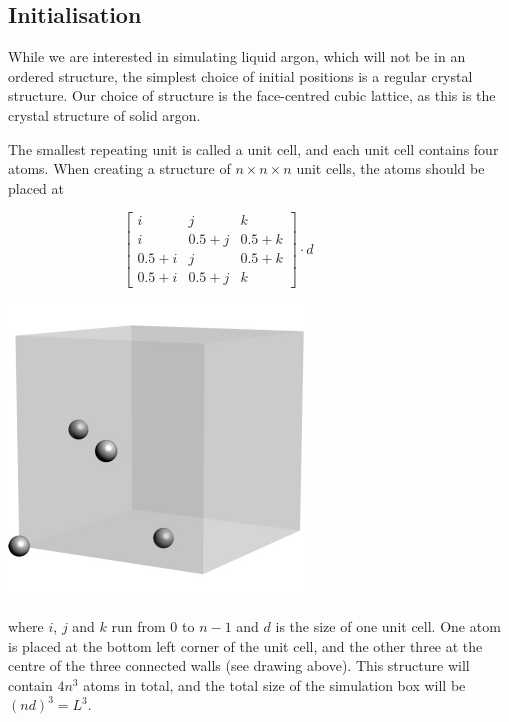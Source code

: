 \documentclass[11pt,british,a4paper]{report}
\begin{document}
\subsection{Initialisation}
While we are interested in simulating liquid argon, which will not be in an ordered structure, the simplest choice of initial positions is a regular crystal structure. Our choice of structure is the face-centred cubic lattice, as this is the crystal structure of solid argon.

The smallest repeating unit is called a unit cell, and each unit cell contains four atoms. When creating a structure of \(n\times n\times n\) unit cells, the atoms should be placed at

\hspace{0.1\textwidth}
\begin{minipage}{0.4\textwidth}
    \centering
    \hfill
    \[
        \begin{bmatrix}
            i & j & k \\
            i & 0.5+j & 0.5+k \\
            0.5+i & j & 0.5+k \\
            0.5+i & 0.5+j & k
        \end{bmatrix}\cdot d\qquad \qquad\qquad
    \]
\end{minipage}
\begin{minipage}{0.4\textwidth}
    \centering
    \includegraphics{fig.pdf}
\end{minipage}

where \(i\), \(j\) and \(k\) run from \(0\) to \(n-1\) and \(d\) is the size of one unit cell. One atom is placed at the bottom left corner of the unit cell, and the other three at
the centre of the three connected walls (see drawing above). This structure will contain \(4n^3\) atoms in total, and the total size of the simulation box will be $(nd)^3=L^3$.
\end{document}
